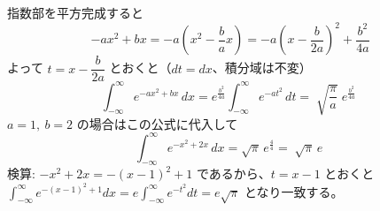 
指数部を平方完成すると
\[
-a x^{2} + b x = -a\left(x^{2} - \frac{b}{a}x\right)
= -a\left(x - \frac{b}{2a}\right)^{2} + \frac{b^{2}}{4a}
\]
よって $t = x - \dfrac{b}{2a}$ とおくと（$dt = dx$、積分域は不変）
\[
\int_{-\infty}^{\infty} e^{-a x^{2}+bx}\, dx
= e^{\frac{b^{2}}{4a}} \int_{-\infty}^{\infty} e^{-a t^{2}}\, dt
= \boxed{\; \sqrt{\dfrac{\pi}{a}}\; e^{\frac{b^{2}}{4a}} \;}
\]
$a = 1,\ b = 2$ の場合はこの公式に代入して
\[
\int_{-\infty}^{\infty} e^{-x^{2}+2x}\, dx = \sqrt{\pi}\, e^{\frac{4}{4}} = \boxed{\; \sqrt{\pi}\, e \;}
\]
検算: $-x^2+2x = -(x-1)^2+1$ であるから、$t=x-1$ とおくと $\int_{-\infty}^{\infty}e^{-(x-1)^2+1}dx = e\int_{-\infty}^{\infty}e^{-t^2}dt = e\sqrt{\pi}$ となり一致する。
